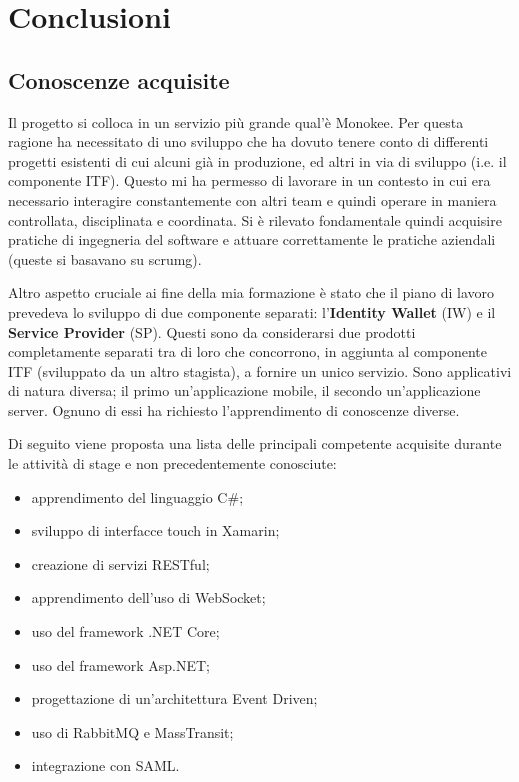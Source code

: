 
\chapter{Conclusioni}
\label{cap:conclusioni}


\section{Conoscenze acquisite}
Il progetto si colloca in un servizio più grande qual'è Monokee. Per questa ragione ha necessitato di uno sviluppo che ha dovuto tenere conto di differenti progetti esistenti di cui alcuni già in produzione, ed altri in via di sviluppo (i.e. il componente ITF). Questo mi ha permesso di lavorare in un contesto in cui era necessario interagire constantemente con altri team e quindi operare in maniera controllata, disciplinata e coordinata. Si è rilevato fondamentale quindi acquisire pratiche di ingegneria del software e attuare correttamente le pratiche aziendali (queste si basavano su \gls{scrumg}).

Altro aspetto cruciale ai fine della mia formazione è stato che il piano di lavoro prevedeva lo sviluppo di due componente separati: l'\textbf{Identity Wallet} (IW) e il \textbf{Service Provider} (SP). Questi sono da considerarsi due prodotti completamente separati tra di loro che concorrono, in aggiunta al componente ITF (sviluppato da un altro stagista), a fornire un unico servizio. Sono applicativi di natura diversa; il primo un'applicazione mobile, il secondo un'applicazione server. Ognuno di essi ha richiesto l'apprendimento di conoscenze diverse.

Di seguito viene proposta una lista delle principali competente acquisite durante le attività di stage e non precedentemente conosciute:
\begin{itemize}
    \item apprendimento del linguaggio C\#;
    \item sviluppo di interfacce touch in Xamarin;
    \item creazione di servizi RESTful;
    \item apprendimento dell'uso di WebSocket;
    \item uso del framework .NET Core;
    \item uso del framework  Asp.NET;
    \item progettazione di un'architettura Event Driven;
    \item uso di RabbitMQ e MassTransit;
    \item integrazione con SAML.
\end{itemize}

